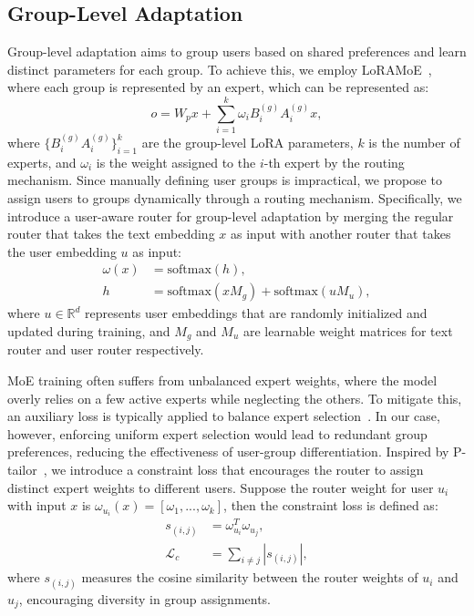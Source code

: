 \documentclass[11pt]{article}
\begin{document}
\subsection{Group-Level Adaptation}
Group-level adaptation aims to group users based on shared preferences and learn distinct parameters for each group. 
To achieve this, we employ LoRAMoE~\cite{dou-etal-2024-loramoe}, where each group is represented by an expert, which can be represented as:
\begin{equation}
    o = W_p x + \sum^k_{i=1} \omega_i B_i^{(g)} A_i^{(g)} x,
\end{equation}
where $\{B_i^{(g)} A_i^{(g)}\}_{i=1}^k$ are the group-level LoRA parameters, $k$ is the number of experts, and $\omega_i$ is the weight assigned to the $i$-th expert by the routing mechanism. 
Since manually defining user groups is impractical, we propose to assign users to groups dynamically through a routing mechanism. 
Specifically, we introduce a user-aware router for group-level adaptation by merging the regular router that takes the text embedding $x$ as input with another router that takes the user embedding $u$ as input:
\begin{equation}
\begin{split}
    \omega(x) &= \text{softmax}(h), \\
    h &= \text{softmax}(x M_g) + \text{softmax}(u M_u), 
\end{split}
\end{equation}
where $u \in \mathbb{R}^d$ represents user embeddings that are randomly initialized and updated during training, and $M_g$ and $M_u$ are learnable weight matrices for text router and user router respectively.

MoE training often suffers from unbalanced expert weights, where the model overly relies on a few active experts while neglecting the others. 
To mitigate this, an auxiliary loss is typically applied to balance expert selection~\cite{dou-etal-2024-loramoe, luo2024moelora, liu2024when}. 
In our case, however, enforcing uniform expert selection would lead to redundant group preferences, reducing the effectiveness of user-group differentiation. 
Inspired by P-tailor~\cite{dan2024p}, we introduce a constraint loss that encourages the router to assign distinct expert weights to different users.
Suppose the router weight for user $u_i$ with input $x$ is $\omega_{u_i}(x) = [\omega_1,...,\omega_k]$, then the constraint loss is defined as:
\begin{equation}
\begin{split}
   s_{(i,j)} &=  \omega_{u_i}^T\omega_{u_j}, \\
   \mathcal{L}_c &= \sum_{i \neq j}|s_{(i,j)}|,
\end{split}
\end{equation}
where $s_{(i,j)}$ measures the cosine similarity between the router weights of $u_i$ and $u_j$, encouraging diversity in group assignments.
\end{document}

